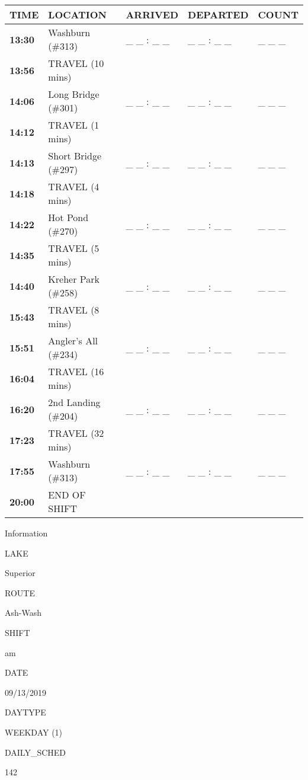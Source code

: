 \documentclass[]{article}
\begin{document}
\begin{tabular}{>{\bfseries}lllll}
\toprule
\textbf{TIME} & \textbf{LOCATION} & \textbf{ARRIVED} & \textbf{DEPARTED} & \textbf{COUNT}\\
\midrule
13:30 & Washburn (\#313) & \_ \_ : \_ \_ & \_ \_ : \_ \_ & \_ \_ \_\\
13:56 & TRAVEL (10 mins) &  &  & \\
14:06 & Long Bridge (\#301) & \_ \_ : \_ \_ & \_ \_ : \_ \_ & \_ \_ \_\\
14:12 & TRAVEL (1 mins) &  &  & \\
14:13 & Short Bridge (\#297) & \_ \_ : \_ \_ & \_ \_ : \_ \_ & \_ \_ \_\\
14:18 & TRAVEL (4 mins) &  &  & \\
14:22 & Hot Pond (\#270) & \_ \_ : \_ \_ & \_ \_ : \_ \_ & \_ \_ \_\\
14:35 & TRAVEL (5 mins) &  &  & \\
14:40 & Kreher Park (\#258) & \_ \_ : \_ \_ & \_ \_ : \_ \_ & \_ \_ \_\\
15:43 & TRAVEL (8 mins) &  &  & \\
15:51 & Angler's All (\#234) & \_ \_ : \_ \_ & \_ \_ : \_ \_ & \_ \_ \_\\
16:04 & TRAVEL (16 mins) &  &  & \\
16:20 & 2nd Landing (\#204) & \_ \_ : \_ \_ & \_ \_ : \_ \_ & \_ \_ \_\\
17:23 & TRAVEL (32 mins) &  &  & \\
17:55 & Washburn (\#313) & \_ \_ : \_ \_ & \_ \_ : \_ \_ & \_ \_ \_\\
20:00 & END OF SHIFT &  &  & \\
\bottomrule
\end{tabular}\newpage

Information

LAKE

Superior

ROUTE

Ash-Wash

SHIFT

am

DATE

09/13/2019

DAYTYPE

WEEKDAY (1)

DAILY\_SCHED

142

\vspace{24pt}
\end{document}

